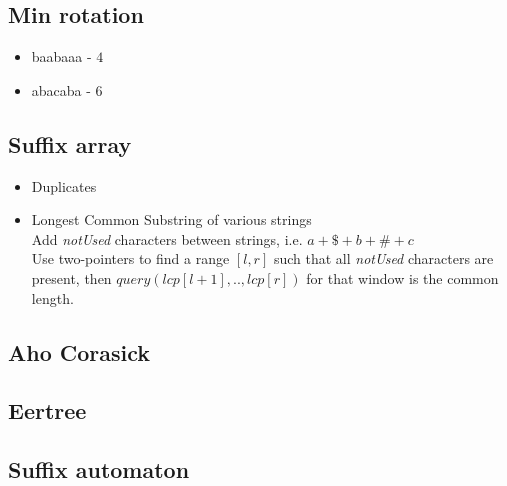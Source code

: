 \subsection{Min rotation }

\begin{itemize}[noitemsep]
  \item baabaaa - $4$
  \item abacaba - $6$
\end{itemize}

\subsection{Suffix array }

\begin{itemize}[noitemsep]
  \item Duplicates 

  \item Longest Common Substring of various strings \\
  Add \emph{notUsed} characters between strings, i.e. $a + \$ + b + \# + c$ \\ 
  Use two-pointers to find a range $[l, r]$ such that all \emph{notUsed} characters are present, then $query(lcp[l + 1],..,lcp[r])$ for that window is the common length. \\

\end{itemize}

\subsection{Aho Corasick }


\subsection{Eertree }


\subsection{Suffix automaton }

